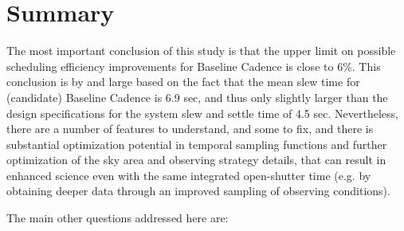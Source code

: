 \navigationbar


\section{Summary}
\def\secname{cadexp:summary}\label{sec:\secname}

The most important conclusion of this study is that the upper limit on
possible scheduling efficiency improvements for Baseline Cadence is
close to 6\%. This conclusion is by and large based on the fact that
the mean slew time for (candidate) Baseline Cadence is 6.9 sec, and
thus only slightly larger than the design specifications for the
system slew and settle time of 4.5 sec.  Nevertheless, there are a
number of features to understand, and some to fix, and there is
substantial optimization potential in temporal sampling functions and
further optimization of the sky area and observing strategy details,
that can result in enhanced science even with the same integrated
open-shutter time (e.g. by obtaining deeper data through an improved
sampling of observing conditions).

\vskip 0.2in
The main other questions addressed here are:

